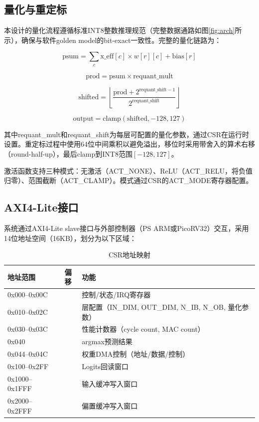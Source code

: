 \documentclass[12pt, a4paper]{article}
\begin{document}
\subsection{量化与重定标}

本设计的量化流程遵循标准INT8整数推理规范（完整数据通路如图\ref{fig:arch}所示）\cite{6}，确保与软件golden model的bit-exact一致性。完整的量化链路为：

\begin{equation}
	\text{psum} = \sum_c \text{x\_eff}[c] \times w[r][c] + \text{bias}[r]
\end{equation}

\begin{equation}
	\text{prod} = \text{psum} \times \text{requant\_mult}
\end{equation}

\begin{equation}
	\text{shifted} = \left\lfloor \frac{\text{prod} + 2^{\text{requant\_shift}-1}}{2^{\text{requant\_shift}}} \right\rfloor
\end{equation}

\begin{equation}
	\text{output} = \text{clamp}(\text{shifted}, -128, 127)
\end{equation}

其中requant\_mult和requant\_shift为每层可配置的量化参数，通过CSR在运行时设置。重定标过程中使用64位中间乘积以避免溢出，移位时采用带舍入的算术右移（round-half-up），最后clamp到INT8范围$[-128, 127]$。

激活函数支持三种模式：无激活（ACT\_NONE）、ReLU（ACT\_RELU，将负值归零）、范围截断（ACT\_CLAMP）。模式通过CSR的ACT\_MODE寄存器配置。

\subsection{AXI4-Lite接口}

系统通过AXI4-Lite slave接口与外部控制器（PS ARM或PicoRV32）交互，采用14位地址空间（16KB），划分为以下区域：

\begin{table}[H]
	\centering
	\caption{CSR地址映射}
	\begin{tabular}{lcl}
		\toprule
		地址范围 & 偏移 & 功能 \\
		\midrule
		0x000--0x00C & & 控制/状态/IRQ寄存器 \\
		0x010--0x02C & & 层配置（IN\_DIM, OUT\_DIM, N\_IB, N\_OB, 量化参数） \\
		0x030--0x03C & & 性能计数器（cycle count, MAC count） \\
		0x040 & & argmax预测结果 \\
		0x044--0x04C & & 权重DMA控制（地址/数据/控制） \\
		0x100--0x2FF & & Logits回读窗口 \\
		0x1000--0x1FFF & & 输入缓冲写入窗口 \\
		0x2000--0x2FFF & & 偏置缓冲写入窗口 \\
		\bottomrule
	\end{tabular}
\end{table}
\end{document}
